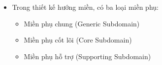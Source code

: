\begin{itemize}

\item Trong thiết kế hướng miền, có ba loại miền phụ:

\begin{itemize}

\item Miền phụ chung (Generic Subdomain)

\item Miền phụ cốt lõi (Core Subdomain)

\item Miền phụ hỗ trợ (Supporting Subdomain)

\end{itemize}

\end{itemize}